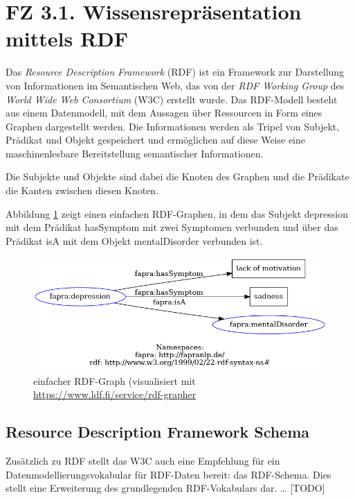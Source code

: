 %
%
\section{FZ 3.1. Wissensrepräsentation mittels RDF}
\label{sec:fz3.1.} 

Das \emph{Resource Description Framework} (RDF) \citep{w3c_all_2022} ist ein Framework zur Darstellung von Informationen im Semantischen Web, das von der \emph{RDF Working Group} des  \emph{World Wide Web Consortium} (W3C) erstellt wurde. Das RDF-Modell besteht aus einem Datenmodell, mit dem Aussagen über Ressourcen in Form eines Graphen dargestellt werden. Die Informationen werden als Tripel von Subjekt, Prädikat und Objekt gespeichert und ermöglichen auf diese Weise eine maschinenlesbare Bereitstellung semantischer Informationen.

Die Subjekte und Objekte sind dabei die Knoten des Graphen und die Prädikate die Kanten zwischen diesen Knoten.

Abbildung \ref{fig:rdfgraph} zeigt einen einfachen RDF-Graphen, in dem das Subjekt \glqq depression\grqq{} mit dem Prädikat \glqq hasSymptom\grqq{} mit zwei Symptomen verbunden und über das Prädikat \glqq isA\grqq{} mit dem Objekt \glqq mentalDisorder\grqq{} verbunden ist.

\begin{figure}[h]
    \centering
    \includegraphics[width=\textwidth]{pictures/rdf-graph.png}
    \caption{einfacher RDF-Graph (visualisiert mit \url{https://www.ldf.fi/service/rdf-grapher}}
    \label{fig:rdfgraph}
\end{figure}

\subsection{Resource Description Framework Schema}

Zusätzlich zu RDF stellt das W3C auch eine Empfehlung für ein Datenmodellierungsvokabular für RDF-Daten bereit: das RDF-Schema. Dies stellt eine Erweiterung des grundlegenden RDF-Vokabulars dar. \dots{} [TODO]

